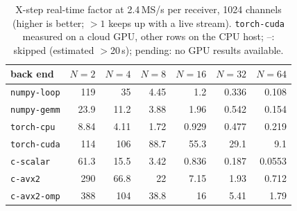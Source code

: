 \begin{table}[t]
\centering\small
\caption{X-step real-time factor at 2.4\,MS/s per receiver, 1024 channels (higher is better; $>1$ keeps up with a live stream). \texttt{torch-cuda} measured on a cloud GPU, other rows on the CPU host; --: skipped (estimated $>$20\,s); pending: no GPU results available.}
\label{tab:corr}
\begin{tabular}{lrrrrrr}
\toprule
back end & $N=2$ & $N=4$ & $N=8$ & $N=16$ & $N=32$ & $N=64$ \\
\midrule
\texttt{numpy-loop} & 119 & 35 & 4.45 & 1.2 & 0.336 & 0.108 \\
\texttt{numpy-gemm} & 23.9 & 11.2 & 3.88 & 1.96 & 0.542 & 0.154 \\
\texttt{torch-cpu} & 8.84 & 4.11 & 1.72 & 0.929 & 0.477 & 0.219 \\
\texttt{torch-cuda} & 114 & 106 & 88.7 & 55.3 & 29.1 & 9.1 \\
\texttt{c-scalar} & 61.3 & 15.5 & 3.42 & 0.836 & 0.187 & 0.0553 \\
\texttt{c-avx2} & 290 & 66.8 & 22 & 7.15 & 1.93 & 0.712 \\
\texttt{c-avx2-omp} & 388 & 104 & 38.8 & 16 & 5.41 & 1.79 \\
\bottomrule
\end{tabular}
\end{table}
